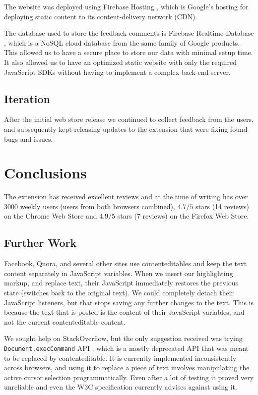 \documentclass[bsc,frontabs,twoside,singlespacing,parskip,deptreport]{infthesis}
\begin{document}
The website was deployed using Firebase Hosting \cite{A8}, which is Google's hosting for deploying static content to its content-delivery network (CDN).

The database used to store the feedback comments is Firebase Realtime Database \cite{A9}, which is a NoSQL cloud database from the same family of Google products. This allowed us to have a secure place to store our data with minimal setup time. It also allowed us to have an optimized static website with only the required JavaScript SDKs without having to implement a complex back-end server.

\section{Iteration}
After the initial web store release we continued to collect feedback from the users, and subsequently kept releasing updates to the extension that were fixing found bugs and issues.


\chapter{Conclusions}
The extension has received excellent reviews and at the time of writing has over 3000 weekly users (users from both browsers combined), $4.7/5$ stars (14 reviews) on the Chrome Web Store and $4.9/5$ stars (7 reviews) on the Firefox Web Store.

\section{Further Work}
Facebook, Quora, and several other sites use contenteditables and keep the text content separately in JavaScript variables. When we insert our highlighting markup, and replace text, their JavaScript immediately restores the previous state (switches back to the original text). We could completely detach their JavaScript listeners, but that stops saving any further changes to the text. This is because the text that is posted is the content of their JavaScript variables, and not the current contenteditable content.

We sought help on StackOverflow, but the only suggestion received was trying \texttt{Document.execCommand} API \cite{A10}, which is a mostly deprecated API that was meant to be replaced by contenteditable. It is currently implemented inconsistently across browsers, and using it to replace a piece of text involves manipulating the active cursor selection programmatically. Even after a lot of testing it proved very unreliable and even the W3C specification currently advises against using it.
\end{document}
